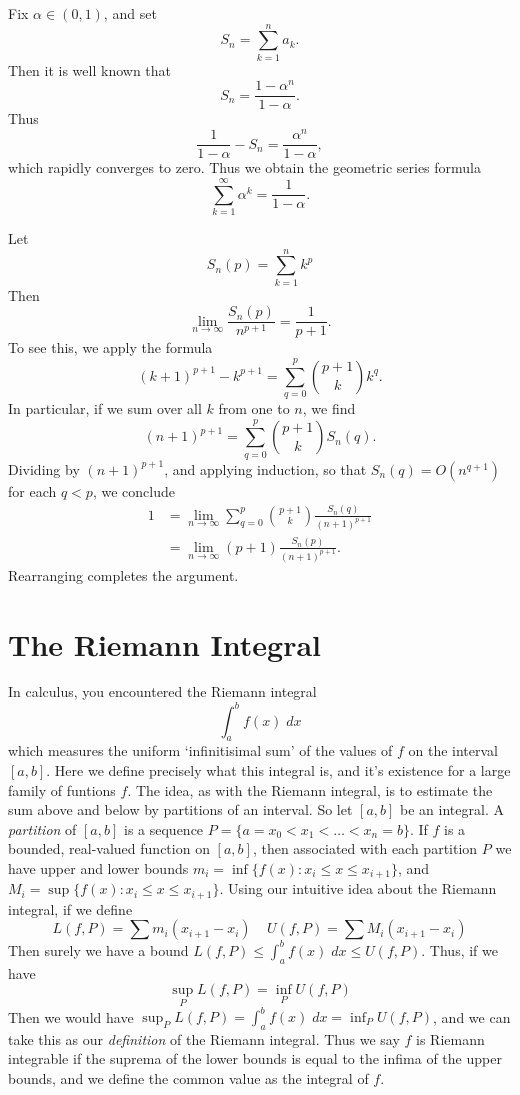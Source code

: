 \begin{example}
    Fix $\alpha \in (0,1)$, and set
    \[ S_n = \sum_{k = 1}^n a_k. \]
    Then it is well known that
    \[ S_n = \frac{1 - \alpha^n}{1 - \alpha}. \]
    Thus
    \[ \frac{1}{1 - \alpha} - S_n = \frac{\alpha^n}{1 - \alpha},  \]
    which rapidly converges to zero. Thus we obtain the geometric series formula
    \[ \sum_{k = 1}^\infty \alpha^k = \frac{1}{1 - \alpha}. \]
\end{example}

\begin{example}
    Let
    \[ S_n(p) = \sum_{k = 1}^n k^p \]
    Then
    \[ \lim_{n \to \infty} \frac{S_n(p)}{n^{p+1}} = \frac{1}{p+1}. \]
    To see this, we apply the formula
    \[ (k + 1)^{p+1} - k^{p+1} = \sum_{q = 0}^p {p+1 \choose k} k^q. \]
    In particular, if we sum over all $k$ from one to $n$, we find
    \[ (n+1)^{p+1} = \sum_{q = 0}^p {p+1 \choose k} S_n(q). \]
    Dividing by $(n+1)^{p+1}$, and applying induction, so that $S_n(q) = O(n^{q+1})$ for each $q < p$, we conclude
    \begin{align*}
        1 &= \lim_{n \to \infty} \sum_{q = 0}^p {p+1 \choose k} \frac{S_n(q)}{(n+1)^{p+1}}\\
        &= \lim_{n \to \infty} (p+1) \frac{S_n(p)}{(n+1)^{p+1}}.
    \end{align*}
    Rearranging completes the argument.
\end{example}


\chapter{The Riemann Integral}

In calculus, you encountered the Riemann integral
%
\[ \int_a^b f(x)\; dx \]
%
which measures the uniform `infinitisimal sum' of the values of $f$ on the interval $[a,b]$. Here we define precisely what this integral is, and it's existence for a large family of funtions $f$. The idea, as with the Riemann integral, is to estimate the sum above and below by partitions of an interval. So let $[a,b]$ be an integral. A {\it partition} of $[a,b]$ is a sequence $P = \{ a = x_0 < x_1 < \dots < x_n = b \}$. If $f$ is a bounded, real-valued function on $[a,b]$, then associated with each partition $P$ we have upper and lower bounds $m_i = \inf \{ f(x): x_i \leq x \leq x_{i+1} \}$, and $M_i = \sup \{ f(x): x_i \leq x \leq x_{i+1} \}$. Using our intuitive idea about the Riemann integral, if we define
%
\[ L(f,P) = \sum m_i (x_{i+1} - x_i)\ \ \ \ \ U(f,P) = \sum M_i (x_{i+1} - x_i) \]
%
Then surely we have a bound $L(f,P) \leq \int_a^b f(x)\; dx \leq U(f,P)$. Thus, if we have
%
\[ \sup_P L(f,P) = \inf_P U(f,P) \]
%
Then we would have $\sup_P L(f,P) = \int_a^b f(x)\; dx = \inf_P U(f,P)$, and we can take this as our {\it definition} of the Riemann integral. Thus we say $f$ is Riemann integrable if the suprema of the lower bounds is equal to the infima of the upper bounds, and we define the common value as the integral of $f$.

